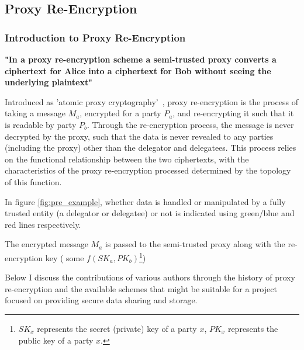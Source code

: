 \subsection{Proxy Re-Encryption}

\subsubsection{Introduction to Proxy Re-Encryption}

\begin{displayquote}{
  \textbf{"In a proxy re-encryption scheme a semi-trusted proxy converts a ciphertext for Alice into a ciphertext for Bob without seeing the underlying plaintext"}~\cite{greenateniese:2006:article}
}\end{displayquote}

Introduced as 'atomic proxy cryptography'~\cite{bbs:1998:book}, proxy re-encryption is the process of taking a message $M_a$, encrypted for a party $P_a$, and re-encrypting it such that it is readable by party $P_b$. Through the re-encryption process, the message is never decrypted by the proxy, such that the data is never revealed to any parties (including the proxy) other than the delegator and delegatees. This process relies on the functional relationship between the two ciphertexts, with the characteristics of the proxy re-encryption processed determined by the topology of this function.



In figure \ref{fig:pre_example}, whether data is handled or manipulated by a fully trusted entity (a delegator or delegatee) or not is indicated using green/blue and red lines respectively.

The encrypted message $M_a$ is passed to the semi-trusted proxy along with the re-encryption key ( some $f(SK_a, PK_b)$\footnote{$SK_x$ represents the secret (private) key of a party $x$, $PK_x$ represents the public key of a party $x$.})

Below I discuss the contributions of various authors through the history of proxy re-encryption and the available schemes that might be suitable for a project focused on providing secure data sharing and storage.


